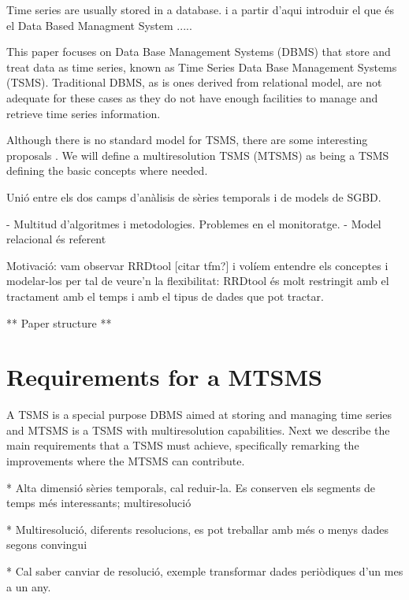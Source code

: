 \documentclass{scrartcl}
\begin{document}
Time series are usually stored in a database.     i a partir d'aqui introduir el que és el Data Based Managment System .....






This paper focuses on Data Base Management Systems (DBMS) that store
and treat data as time series, known as Time Series Data Base
Management Systems (TSMS). Traditional DBMS, as is ones derived from
relational model, are not adequate for these cases as they do not have
enough facilities to manage and retrieve time series information.

Although there is no standard model for TSMS, there are some interesting proposals \cite{dreyer94,zhang11}. We will define a multiresolution TSMS (MTSMS) as being a TSMS defining the basic concepts where needed.





Unió entre els dos camps d'anàlisis de sèries temporals i de models de SGBD. 

- Multitud d'algoritmes i metodologies. Problemes en el monitoratge.
- Model relacional és referent




Motivació: vam observar RRDtool [citar tfm?] i volíem entendre els conceptes i modelar-los per tal de veure'n la flexibilitat: RRDtool és molt restringit amb el tractament amb el temps i amb el tipus de dades que pot tractar.



** Paper structure **



\section{Requirements for a MTSMS}

A TSMS is a special purpose DBMS aimed at storing and managing time
series and MTSMS is a TSMS with multiresolution capabilities. Next we
describe the main requirements that a TSMS must achieve, specifically
remarking the improvements where the MTSMS can contribute.



* Alta dimensió sèries temporals, cal reduir-la. Es conserven els segments de temps més interessants; multiresolució


* Multiresolució, diferents resolucions, es pot treballar amb més o menys dades segons convingui

* Cal saber canviar de resolució, exemple transformar dades periòdiques d'un mes a un any.
\end{document}
